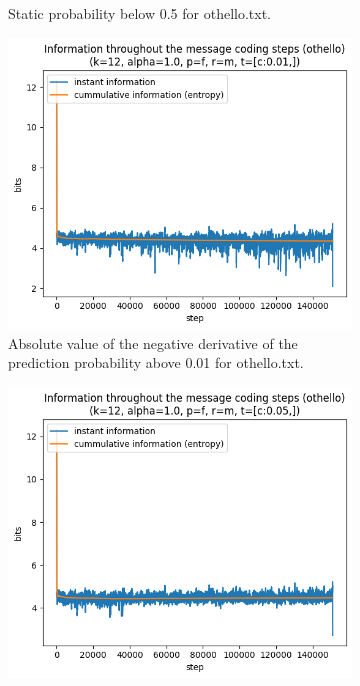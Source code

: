 \documentclass{article}
\begin{document}
\begin{figure}
\begin{subfigure}[b]{0.3\textwidth}
\begin{center}
        \end{center}
        \caption{Static probability below 0.5 for othello.txt.}
        \label{fig:othello-results-threshold-n-0.5}
    \end{subfigure}
    \begin{subfigure}[b]{0.3\textwidth}
        \begin{center}
            \includegraphics[width=1.0\linewidth]{../scripts/images/othello_12_1.0_f_m_[c:0.01,].png}
        \end{center}
        \caption{Absolute value of the negative derivative of the prediction probability above 0.01 for othello.txt.}
        \label{fig:othello-results-threshold-c-0.01}
    \end{subfigure}
    \hfill
    \begin{subfigure}[b]{0.3\textwidth}
        \begin{center}
            \includegraphics[width=1.0\linewidth]{../scripts/images/othello_12_1.0_f_m_[c:0.05,].png}

\end{center}
\end{subfigure}
\end{figure}
\end{document}
